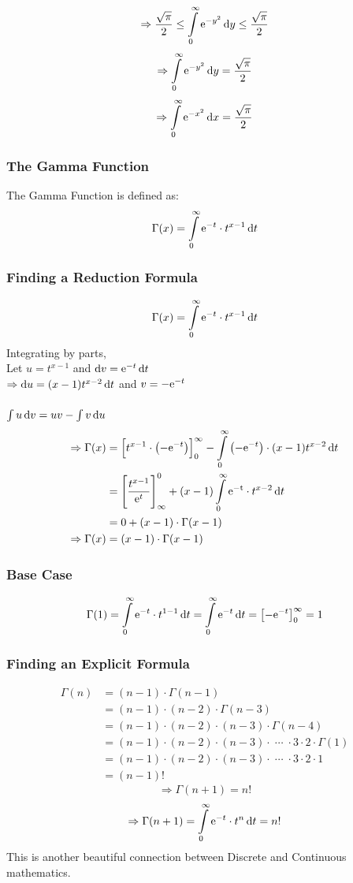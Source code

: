 \documentclass[14]{article}
\theoremstyle{definition}
\theoremstyle{case}
\begin{document}
\[\Rightarrow \dfrac{\sqrt{\pi}}2 \leq \int\limits_0^{\infty} {\rm e}^{-y^2} \dif y \leq \dfrac{\sqrt{\pi}}{2}\]
\[\Rightarrow \int\limits_0^{\infty} {\rm e}^{-y^2} \dif y = \dfrac{\sqrt{\pi}}{2}\]
\[\Rightarrow \int\limits_0^{\infty} {\rm e}^{-x^2} \dif x = \dfrac{\sqrt{\pi}}{2}\]
\pagebreak
\subsubsection{The Gamma Function}
The Gamma Function is defined as:
\[\Gamma(x) = \int\limits_0^{\infty} {\rm e}^{-t} \cdot t^{x-1} \dif t\]
\subsubsection*{Finding a Reduction Formula}
\[\Gamma(x) = \int\limits_0^{\infty} {\rm e}^{-t} \cdot t^{x-1} \dif t\]
Integrating by parts,\\
Let $u = t^{x-1}$ and $\dif v = {\rm e}^{-t} \dif t$\\
$\Rightarrow \dif u = (x-1)t^{x-2} \dif t$ and $v = -{\rm e}^{-t}$\\\\
$\int u \dif v = uv - \int v \dif u$
\begin{align*}
\Rightarrow \Gamma(x) &= \left[ t^{x-1} \cdot \left(-{\rm e}^{-t}\right) \right]_0^{\infty} - \int\limits_0^{\infty} \left( -{\rm e}^{-t}\right) \cdot (x-1)t^{x-2} \dif t\\
&= \left[ \dfrac{t^{x-1}}{{\rm e}^t} \right]_{\infty}^0 + (x-1) \int\limits_0^{\infty} {\rm e^{-t}} \cdot t^{x-2} \dif t\\
&= 0 + (x-1) \cdot \Gamma(x-1)\\
\Rightarrow \Gamma(x) &= (x-1) \cdot \Gamma(x-1)
\end{align*}
\subsubsection*{Base Case}
\[\Gamma(1) = \int\limits_0^{\infty} {\rm e}^{-t} \cdot t^{1-1} \dif t = \int\limits_0^{\infty} {\rm e}^{-t} \dif t = \left[ - {\rm e}^{-t} \right]_0^{\infty} = 1\]
\subsubsection*{Finding an Explicit Formula}
\begin{align*}
\Gamma(n) &= (n-1)\cdot \Gamma(n-1)\\
&= (n-1)\cdot(n-2)\cdot\Gamma(n-3)\\
&= (n-1)\cdot(n-2)\cdot(n-3)\cdot\Gamma(n-4)\\
&= (n-1)\cdot(n-2)\cdot(n-3)\cdot \; \cdots \; \cdot 3 \cdot 2 \cdot \Gamma(1)\\
&= (n-1)\cdot(n-2)\cdot(n-3)\cdot \; \cdots \; \cdot 3 \cdot 2 \cdot 1\\
&= (n-1)!
\end{align*}
\[\Rightarrow \Gamma(n+1) = n!\]
\[\Rightarrow \Gamma(n+1) = \int\limits_0^{\infty}{\rm e}^{-t} \cdot t^{n} \dif t = n!\]
This is another beautiful connection between Discrete and Continuous mathematics.\\\\
\pagebreak
\end{document}
